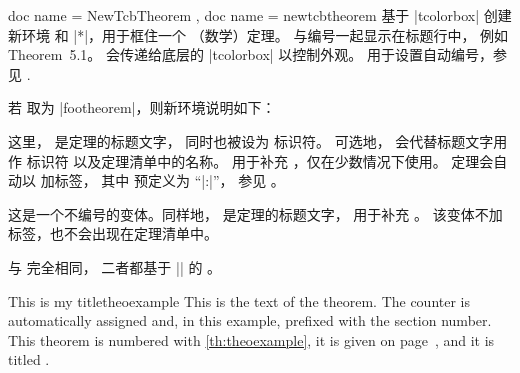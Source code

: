 \begin{docCommands}[
    doc parameter = \oarg{init options}\marg{name}\marg{display name}\marg{options}\marg{prefix},
    doc updated=2022-07-18
    ]
    {
      { doc name = NewTcbTheorem },
      { doc name = newtcbtheorem }
    }
  基于 |tcolorbox| 创建新环境  和 |*|，用于框住一个
  （数学）定理。 与编号一起显示在标题行中，
  例如 \mbox{\flqq Theorem 5.1\frqq}。
   会传递给底层的 |tcolorbox| 以控制外观。
   用于设置自动编号，参见 .\par\medskip

  若  取为 |footheorem|，则新环境说明如下：
  \begin{docEnvironments}[
      doc no index,
      doc name = footheorem,
      doc parameter = \oarg{keys}\oarg{short}\marg{title}\marg{marker}
    ]{}
    这里， 是定理的标题文字，
    同时也被设为  标识符。
    可选地， 会代替标题文字用作  标识符
    以及定理清单中的名称。
     用于补充 ，仅在少数情况下使用。
    定理会自动以  加标签，
    其中  预定义为 \enquote{|:|}，
    参见 。
  \end{docEnvironments}
  \begin{docEnvironments}[
      doc no index,
      doc name = footheorem*,
      doc parameter = \oarg{keys}\marg{title}
    ]{}
    这是一个不编号的变体。同样地， 是定理的标题文字，
     用于补充 。
    该变体不加标签，也不会出现在定理清单中。
  \end{docEnvironments}

  \begin{marker}
   与  完全相同，
  二者都基于 |\NewDocumentCommand| 的 。
  \end{marker}
\clearpage


\begin{dispExample}
\begin{mytheo}{This is my title}{theoexample}
  This is the text of the theorem. The counter is automatically assigned and,
  in this example, prefixed with the section number. This theorem is numbered with
  \ref{th:theoexample}, it is given on page~\pageref{th:theoexample},
  and it is titled \flqq{}\frqq.
\end{mytheo}
\end{dispExample}



\end{docCommands}
